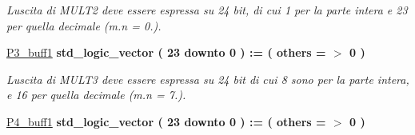 \begin{DoxyCompactItemize}
\begin{DoxyCompactList}\small\item\em L\textquotesingle{}uscita di M\+U\+L\+T2 deve essere espressa su 24 bit, di cui 1 per la parte intera e 23 per quella decimale (m.\+n = 0.). \end{DoxyCompactList}\item 
\hyperlink{group___linear_regression_ga70180d04f093d439774c11c332debaab}{P3\+\_\+buff1} {\bfseries \textcolor{vhdlchar}{std\+\_\+logic\+\_\+vector}\textcolor{vhdlchar}{ }\textcolor{vhdlchar}{(}\textcolor{vhdlchar}{ }\textcolor{vhdlchar}{ } \textcolor{vhdldigit}{23} \textcolor{vhdlchar}{ }\textcolor{vhdlchar}{downto}\textcolor{vhdlchar}{ }\textcolor{vhdlchar}{ } \textcolor{vhdldigit}{0} \textcolor{vhdlchar}{ }\textcolor{vhdlchar}{)}\textcolor{vhdlchar}{ }\textcolor{vhdlchar}{ }\textcolor{vhdlchar}{ }\textcolor{vhdlchar}{\+:}\textcolor{vhdlchar}{=}\textcolor{vhdlchar}{ }\textcolor{vhdlchar}{(}\textcolor{vhdlchar}{ }\textcolor{vhdlchar}{ }\textcolor{vhdlchar}{others}\textcolor{vhdlchar}{ }\textcolor{vhdlchar}{ }\textcolor{vhdlchar}{=}\textcolor{vhdlchar}{ }\textcolor{vhdlchar}{$>$}\textcolor{vhdlchar}{ }\textcolor{vhdlchar}{\textquotesingle{}}\textcolor{vhdlchar}{ } \textcolor{vhdldigit}{0} \textcolor{vhdlchar}{ }\textcolor{vhdlchar}{\textquotesingle{}}\textcolor{vhdlchar}{ }\textcolor{vhdlchar}{)}\textcolor{vhdlchar}{ }} 
\begin{DoxyCompactList}\small\item\em L\textquotesingle{}uscita di M\+U\+L\+T3 deve essere espressa su 24 bit di cui 8 sono per la parte intera, e 16 per quella decimale (m.\+n = 7.). \end{DoxyCompactList}\item 
\hyperlink{group___linear_regression_ga585547e50aaeb76d801f21626a57c3d2}{P4\+\_\+buff1} {\bfseries \textcolor{vhdlchar}{std\+\_\+logic\+\_\+vector}\textcolor{vhdlchar}{ }\textcolor{vhdlchar}{(}\textcolor{vhdlchar}{ }\textcolor{vhdlchar}{ } \textcolor{vhdldigit}{23} \textcolor{vhdlchar}{ }\textcolor{vhdlchar}{downto}\textcolor{vhdlchar}{ }\textcolor{vhdlchar}{ } \textcolor{vhdldigit}{0} \textcolor{vhdlchar}{ }\textcolor{vhdlchar}{)}\textcolor{vhdlchar}{ }\textcolor{vhdlchar}{ }\textcolor{vhdlchar}{ }\textcolor{vhdlchar}{\+:}\textcolor{vhdlchar}{=}\textcolor{vhdlchar}{ }\textcolor{vhdlchar}{(}\textcolor{vhdlchar}{ }\textcolor{vhdlchar}{ }\textcolor{vhdlchar}{others}\textcolor{vhdlchar}{ }\textcolor{vhdlchar}{ }\textcolor{vhdlchar}{=}\textcolor{vhdlchar}{ }\textcolor{vhdlchar}{$>$}\textcolor{vhdlchar}{ }\textcolor{vhdlchar}{\textquotesingle{}}\textcolor{vhdlchar}{ } \textcolor{vhdldigit}{0} \textcolor{vhdlchar}{ }\textcolor{vhdlchar}{\textquotesingle{}}\textcolor{vhdlchar}{ }\textcolor{vhdlchar}{)}\textcolor{vhdlchar}{ }} 

\end{DoxyCompactItemize}

